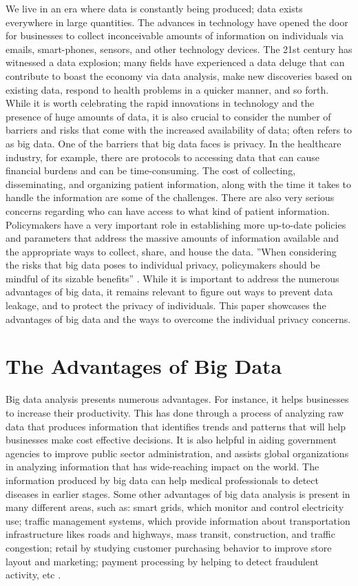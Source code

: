 \documentclass[sigconf]{acmart}
\begin{document}
We live in an era where data is constantly being produced; data exists everywhere in large quantities. The advances in technology have opened the door for businesses to collect inconceivable amounts of information on individuals via emails, smart-phones, sensors, and other technology devices. The 21st century has witnessed a data explosion; many fields have experienced a data deluge that can contribute to boast the economy via data analysis, make new discoveries based on existing data, respond to health problems in a quicker manner, and so forth. While it is worth celebrating the rapid innovations in technology and the presence of huge amounts of data, it is also crucial to consider the number of barriers and risks that come with the increased availability of data; often refers to as big data. 
One of the barriers that big data faces is privacy. In the healthcare industry, for example, there are protocols to accessing data that can cause financial burdens and can be time-consuming.  The cost of collecting, disseminating, and organizing patient information, along with the time it takes to handle the information are some of the challenges. There are also very serious concerns regarding who can have access to what kind of patient information. Policymakers have a very important role in establishing more up-to-date policies and parameters that address the massive amounts of information available and the appropriate ways to collect, share, and house the data. ''When considering the risks that big data poses to individual privacy, policymakers should be mindful of its sizable benefits'' \cite{tene2012big}. While it is important to address the numerous advantages of big data, it remains relevant to figure out ways to prevent data leakage, and to protect the privacy of individuals. This paper showcases the advantages of big data and the ways to overcome the individual privacy concerns. 

\section{The Advantages of Big Data}

Big data analysis presents numerous advantages. For instance, it helps businesses to increase their productivity. This has done through a process of analyzing raw data that produces information that identifies trends and patterns that will help businesses make cost effective decisions. It is also helpful in aiding government agencies to improve public sector administration, and assists global organizations in analyzing information that has wide-reaching impact on the world. The information produced by big data can help medical professionals to detect diseases in earlier stages. Some other advantages of big data analysis is present in many different areas, such as:  smart grids, which monitor and control electricity use; traffic management systems, which provide information about transportation infrastructure likes roads and highways, mass transit, construction, and traffic congestion; retail by studying customer purchasing behavior to improve store layout and marketing; payment processing by helping to detect fraudulent activity, etc \cite{tene2012big}.
\end{document}
